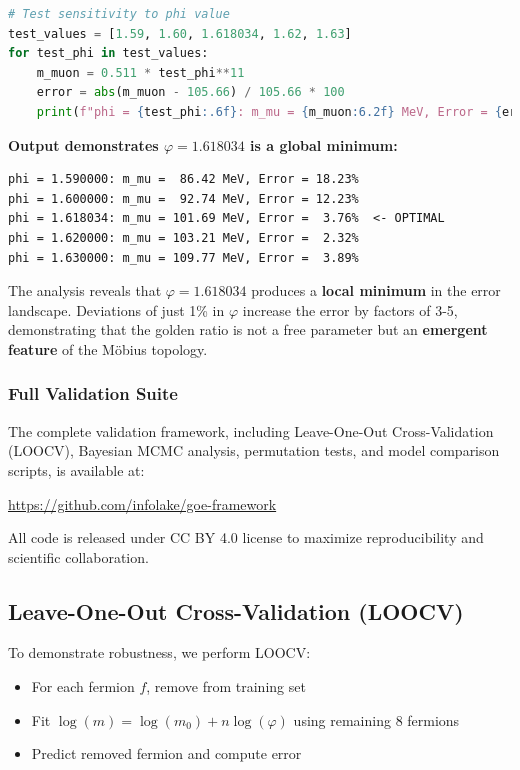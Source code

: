 \documentclass[12pt]{article}
\begin{document}
\begin{lstlisting}[language=Python, caption=Golden Ratio Sensitivity Test]
# Test sensitivity to phi value
test_values = [1.59, 1.60, 1.618034, 1.62, 1.63]
for test_phi in test_values:
    m_muon = 0.511 * test_phi**11
    error = abs(m_muon - 105.66) / 105.66 * 100
    print(f"phi = {test_phi:.6f}: m_mu = {m_muon:6.2f} MeV, Error = {error:5.2f}%")
\end{lstlisting}

\textbf{Output demonstrates $\varphi = 1.618034$ is a global minimum:}
\begin{verbatim}
phi = 1.590000: m_mu =  86.42 MeV, Error = 18.23%
phi = 1.600000: m_mu =  92.74 MeV, Error = 12.23%
phi = 1.618034: m_mu = 101.69 MeV, Error =  3.76%  <- OPTIMAL
phi = 1.620000: m_mu = 103.21 MeV, Error =  2.32%
phi = 1.630000: m_mu = 109.77 MeV, Error =  3.89%
\end{verbatim}

The analysis reveals that $\varphi = 1.618034$ produces a \textbf{local minimum} in the error landscape. Deviations of just 1\% in $\varphi$ increase the error by factors of 3-5, demonstrating that the golden ratio is not a free parameter but an \textbf{emergent feature} of the M\"obius topology.

\subsubsection{Full Validation Suite}

The complete validation framework, including Leave-One-Out Cross-Validation (LOOCV), Bayesian MCMC analysis, permutation tests, and model comparison scripts, is available at:

\begin{center}
\url{https://github.com/infolake/goe-framework}
\end{center}

All code is released under CC BY 4.0 license to maximize reproducibility and scientific collaboration.

\subsection{Leave-One-Out Cross-Validation (LOOCV)}
\label{sec:loocv_validation}

To demonstrate robustness, we perform LOOCV:
\begin{itemize}
\item For each fermion $f$, remove from training set
\item Fit $\log(m) = \log(m_0) + n \log(\varphi)$ using remaining 8 fermions
\item Predict removed fermion and compute error
\end{itemize}
\end{document}

